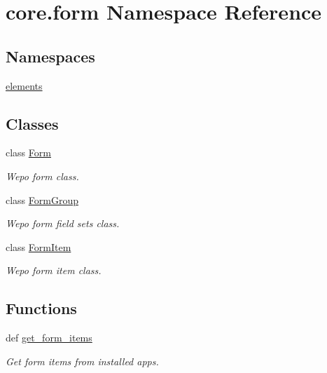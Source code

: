 \hypertarget{namespacecore_1_1form}{\section{core.\-form Namespace Reference}
\label{namespacecore_1_1form}
}
\subsection*{Namespaces}
\begin{DoxyCompactItemize}
\item 
\hyperlink{namespacecore_1_1form_1_1elements}{elements}
\end{DoxyCompactItemize}
\subsection*{Classes}
\begin{DoxyCompactItemize}
\item 
class \hyperlink{classcore_1_1form_1_1Form}{Form}
\begin{DoxyCompactList}\small\item\em Wepo form class. \end{DoxyCompactList}\item 
class \hyperlink{classcore_1_1form_1_1FormGroup}{Form\-Group}
\begin{DoxyCompactList}\small\item\em Wepo form field sets class. \end{DoxyCompactList}\item 
class \hyperlink{classcore_1_1form_1_1FormItem}{Form\-Item}
\begin{DoxyCompactList}\small\item\em Wepo form item class. \end{DoxyCompactList}\end{DoxyCompactItemize}
\subsection*{Functions}
\begin{DoxyCompactItemize}
\item 
def \hyperlink{namespacecore_1_1form_aafa98fa8aa06421679f6f115265ba02a}{get\-\_\-form\-\_\-items}
\begin{DoxyCompactList}\small\item\em Get form items from installed apps. \end{DoxyCompactList}\end{DoxyCompactItemize}


